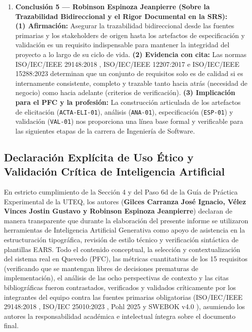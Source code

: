 \documentclass[conference,10pt]{IEEEtran}
\begin{document}
\begin{enumerate}
		\item \textbf{Conclusión 5 --- Robinson Espinoza Jeanpierre (Sobre la Trazabilidad Bidireccional y el Rigor Documental en la SRS):} \\
		\textbf{(1) Afirmación:} Asegurar la trazabilidad bidireccional desde las fuentes primarias y los stakeholders de origen hasta los artefactos de especificación y validación es un requisito indispensable para mantener la integridad del proyecto a lo largo de su ciclo de vida. \textbf{(2) Evidencia con cita:} Las normas ISO/IEC/IEEE 29148:2018 \cite{ieee29148}, ISO/IEC/IEEE 12207:2017 \cite{ieee12207} e ISO/IEC/IEEE 15288:2023 \cite{ieee15288} determinan que un conjunto de requisitos solo es de calidad si es internamente consistente, completo y trazable tanto hacia atrás (necesidad de negocio) como hacia adelante (criterios de verificación). \textbf{(3) Implicación para el PFC y la profesión:} La construcción articulada de los artefactos de elicitación (\texttt{ACTA-ELI-01}), análisis (\texttt{ANA-01}), especificación (\texttt{ESP-01}) y validación (\texttt{VAL-01}) nos proporciona una línea base formal y verificable para las siguientes etapas de la carrera de Ingeniería de Software.
	\end{enumerate}
	\subsection{Declaración Explícita de Uso Ético y Validación Crítica de Inteligencia Artificial}
	En estricto cumplimiento de la Sección 4 y del Paso 6d de la Guía de Práctica Experimental de la UTEQ, los autores (\textbf{Gilces Carranza José Ignacio, Vélez Vinces Jostin Gustavo y Robinson Espinoza Jeanpierre}) declaran de manera transparente que durante la elaboración del presente informe se utilizaron herramientas de Inteligencia Artificial Generativa como apoyo de asistencia en la estructuración tipográfica, revisión de estilo técnico y verificación sintáctica de plantillas EARS. Todo el contenido conceptual, la selección y contextualización del sistema real en Quevedo (PFC), las métricas cuantitativas de los 15 requisitos (verificando que se mantengan libres de decisiones prematuras de implementación), el análisis de las ocho perspectivas de contexto y las citas bibliográficas fueron contrastados, verificados y validados críticamente por los integrantes del equipo contra las fuentes primarias obligatorias (ISO/IEC/IEEE 29148:2018 \cite{ieee29148}, ISO/IEC 25010:2023 \cite{iso25010}, Pohl 2025 \cite{pohl2025} y SWEBOK v4.0 \cite{swebok2024}), asumiendo los autores la responsabilidad académica e intelectual íntegra sobre el documento final.
\end{document}

